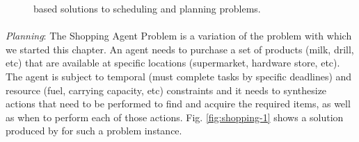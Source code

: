 {\begin{figure}[t]
\centering
{}\qquad
{}
\caption{\small \eu based solutions to scheduling and planning problems.}
\end{figure}


\paragraph{} \textit{Planning}: The Shopping Agent Problem
\cite{russelnorvig} is a variation of the problem with which we
started this chapter.  An agent needs to purchase a set of products
(milk, drill, etc) that are available at specific locations
(supermarket, hardware store, etc). The agent is subject to temporal
(must complete tasks by specific deadlines) and resource (fuel,
carrying capacity, etc) constraints and it needs to synthesize actions
that need to be performed to find and acquire the required items, as
well as when to perform each of those actions.
Fig. \ref{fig:shopping-1} shows a solution produced by \eu for such a
problem instance.

}
